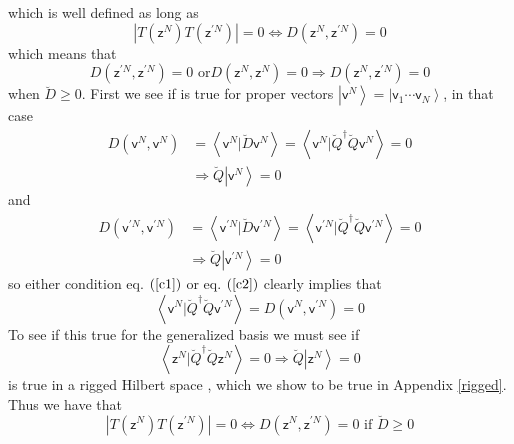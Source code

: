 \documentclass[aps,preprint]{revtex4}%
\begin{document}
which is well defined as long as
\begin{equation}
\left\vert T\left(  \mathsf{z}^{N}\right)  T\left(  \mathsf{z}^{\prime
N}\right)  \right\vert =0\Leftrightarrow D\left(  \mathsf{z}^{N}%
,\mathsf{z}^{\prime N}\right)  =0
\end{equation}
which means that
\begin{equation}
D\left(  \mathsf{z}^{\prime N},\mathsf{z}^{\prime N}\right)  =0\text{ or
}D\left(  \mathsf{z}^{N},\mathsf{z}^{N}\right)  =0\Rightarrow D\left(
\mathsf{z}^{N},\mathsf{z}^{\prime N}\right)  =0
\end{equation}
when $\breve{D}\geq0$. First we see if is true for proper vectors $\left\vert
\mathsf{v}^{N}\right\rangle =\left\vert \mathsf{v}_{1}\cdots\mathsf{v}%
_{N}\right\rangle $, in that case
\begin{align}
D\left(  \mathsf{v}^{N},\mathsf{v}^{N}\right)   &  =\left\langle
\mathsf{v}^{N}|\breve{D}\mathsf{v}^{N}\right\rangle =\left\langle
\mathsf{v}^{N}|\breve{Q}^{\dagger}\breve{Q}\mathsf{v}^{N}\right\rangle
=0\nonumber\\
&  \Rightarrow\breve{Q}\left\vert \mathsf{v}^{N}\right\rangle =0 \label{c1}%
\end{align}
and
\begin{align}
D\left(  \mathsf{v}^{\prime N},\mathsf{v}^{\prime N}\right)   &  =\left\langle
\mathsf{v}^{\prime N}|\breve{D}\mathsf{v}^{\prime N}\right\rangle
=\left\langle \mathsf{v}^{\prime N}|\breve{Q}^{\dagger}\breve{Q}%
\mathsf{v}^{\prime N}\right\rangle =0\nonumber\\
&  \Rightarrow\breve{Q}\left\vert \mathsf{v}^{\prime N}\right\rangle =0
\label{c2}%
\end{align}
so either condition eq. $\left(  \ref{c1}\right)  $ or eq. $\left(
\ref{c2}\right)  $ clearly implies that
\begin{equation}
\left\langle \mathsf{v}^{N}|\breve{Q}^{\dagger}\breve{Q}\mathsf{v}^{\prime
N}\right\rangle =D\left(  \mathsf{v}^{N},\mathsf{v}^{\prime N}\right)  =0
\end{equation}
To see if this true for the generalized basis we must see if
\begin{equation}
\left\langle \mathsf{z}^{N}|\breve{Q}^{\dagger}\breve{Q}\mathsf{z}%
^{N}\right\rangle =0\Rightarrow\breve{Q}\left\vert \mathsf{z}^{N}\right\rangle
=0
\end{equation}
is true in a rigged Hilbert space \cite{Bohm78}, which we show to be true in
Appendix \ref{rigged}. Thus we have that
\begin{equation}
\left\vert T\left(  \mathsf{z}^{N}\right)  T\left(  \mathsf{z}^{\prime
N}\right)  \right\vert =0\Leftrightarrow D\left(  \mathsf{z}^{N}%
,\mathsf{z}^{\prime N}\right)  =0\text{ if }\breve{D}\geq0
\end{equation}
\end{document}
